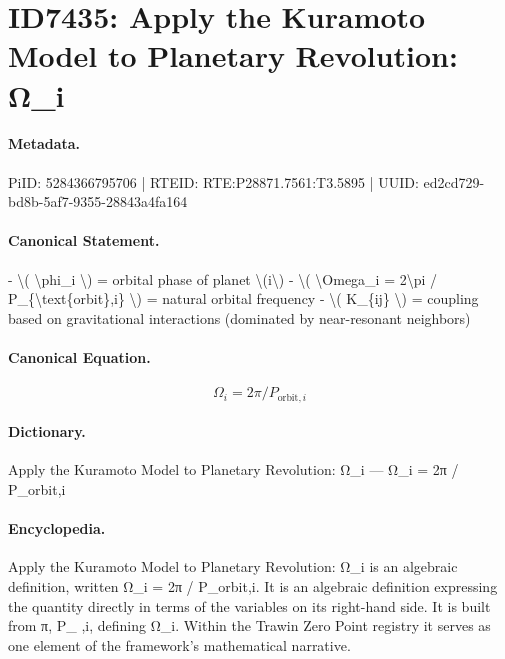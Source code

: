 \section*{ID7435: Apply the Kuramoto Model to Planetary Revolution: Ω\_i}
\paragraph{Metadata.}
PiID: 5284366795706 | RTEID: RTE:P28871.7561:T3.5895 | UUID: ed2cd729-bd8b-5af7-9355-28843a4fa164

\paragraph{Canonical Statement.}
- \textbackslash{}( \textbackslash{}phi\_i \textbackslash{}) = orbital phase of planet \textbackslash{}(i\textbackslash{}) - \textbackslash{}( \textbackslash{}Omega\_i = 2\textbackslash{}pi / P\_\{\textbackslash{}text\{orbit\},i\} \textbackslash{}) = natural orbital frequency - \textbackslash{}( K\_\{ij\} \textbackslash{}) = coupling based on gravitational interactions (dominated by near-resonant neighbors)

\paragraph{Canonical Equation.}
\[
\Omega_i = 2\pi / P_{\text{orbit},i}
\]

\paragraph{Dictionary.}
Apply the Kuramoto Model to Planetary Revolution: Ω\_i — Ω\_i = 2π / P\_orbit,i

\paragraph{Encyclopedia.}
Apply the Kuramoto Model to Planetary Revolution: Ω\_i is an algebraic definition, written Ω\_i = 2π / P\_orbit,i. It is an algebraic definition expressing the quantity directly in terms of the variables on its right-hand side. It is built from π, P\_ ,i, defining Ω\_i. Within the Trawin Zero Point registry it serves as one element of the framework's mathematical narrative.
